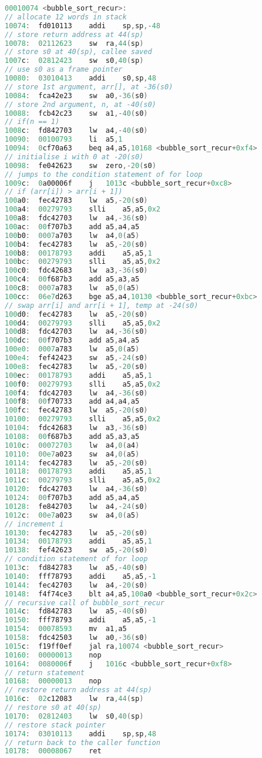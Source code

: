 \documentclass[
    a4paper,
    oneside,
    adjustmath,
    finemath,
    itemph,
    nonfrench,
    11pt
]{oblivoir}
\begin{document}
    \begin{lstlisting}[language=C, caption=Recursive bubble sort in RV32I]
00010074 <bubble_sort_recur>:
// allocate 12 words in stack
10074:	fd010113	addi	sp,sp,-48
// store return address at 44(sp)
10078:	02112623	sw	ra,44(sp)
// store s0 at 40(sp), callee saved
1007c:	02812423	sw	s0,40(sp)
// use s0 as a frame pointer
10080:	03010413	addi	s0,sp,48
// store 1st argument, arr[], at -36(s0)
10084:	fca42e23	sw	a0,-36(s0)
// store 2nd argument, n, at -40(s0)
10088:	fcb42c23	sw	a1,-40(s0)
// if(n == 1)
1008c:	fd842703	lw	a4,-40(s0)
10090:	00100793	li	a5,1
10094:	0cf70a63	beq	a4,a5,10168 <bubble_sort_recur+0xf4>
// initialise i with 0 at -20(s0)
10098:	fe042623	sw	zero,-20(s0)
// jumps to the condition statement of for loop
1009c:	0a00006f	j	1013c <bubble_sort_recur+0xc8>
// if (arr[i]) > arr[i + 1])
100a0:	fec42783	lw	a5,-20(s0)
100a4:	00279793	slli	a5,a5,0x2
100a8:	fdc42703	lw	a4,-36(s0)
100ac:	00f707b3	add	a5,a4,a5
100b0:	0007a703	lw	a4,0(a5)
100b4:	fec42783	lw	a5,-20(s0)
100b8:	00178793	addi	a5,a5,1
100bc:	00279793	slli	a5,a5,0x2
100c0:	fdc42683	lw	a3,-36(s0)
100c4:	00f687b3	add	a5,a3,a5
100c8:	0007a783	lw	a5,0(a5)
100cc:	06e7d263	bge	a5,a4,10130 <bubble_sort_recur+0xbc>
// swap arr[i] and arr[i + 1], temp at -24(s0)
100d0:	fec42783	lw	a5,-20(s0)
100d4:	00279793	slli	a5,a5,0x2
100d8:	fdc42703	lw	a4,-36(s0)
100dc:	00f707b3	add	a5,a4,a5
100e0:	0007a783	lw	a5,0(a5)
100e4:	fef42423	sw	a5,-24(s0)
100e8:	fec42783	lw	a5,-20(s0)
100ec:	00178793	addi	a5,a5,1
100f0:	00279793	slli	a5,a5,0x2
100f4:	fdc42703	lw	a4,-36(s0)
100f8:	00f70733	add	a4,a4,a5
100fc:	fec42783	lw	a5,-20(s0)
10100:	00279793	slli	a5,a5,0x2
10104:	fdc42683	lw	a3,-36(s0)
10108:	00f687b3	add	a5,a3,a5
1010c:	00072703	lw	a4,0(a4)
10110:	00e7a023	sw	a4,0(a5)
10114:	fec42783	lw	a5,-20(s0)
10118:	00178793	addi	a5,a5,1
1011c:	00279793	slli	a5,a5,0x2
10120:	fdc42703	lw	a4,-36(s0)
10124:	00f707b3	add	a5,a4,a5
10128:	fe842703	lw	a4,-24(s0)
1012c:	00e7a023	sw	a4,0(a5)
// increment i
10130:	fec42783	lw	a5,-20(s0)
10134:	00178793	addi	a5,a5,1
10138:	fef42623	sw	a5,-20(s0)
// condition statement of for loop
1013c:	fd842783	lw	a5,-40(s0)
10140:	fff78793	addi	a5,a5,-1
10144:	fec42703	lw	a4,-20(s0)
10148:	f4f74ce3	blt	a4,a5,100a0 <bubble_sort_recur+0x2c>
// recursive call of bubble_sort_recur
1014c:	fd842783	lw	a5,-40(s0)
10150:	fff78793	addi	a5,a5,-1
10154:	00078593	mv	a1,a5
10158:	fdc42503	lw	a0,-36(s0)
1015c:	f19ff0ef	jal	ra,10074 <bubble_sort_recur>
10160:	00000013	nop
10164:	0080006f	j	1016c <bubble_sort_recur+0xf8>
// return statement
10168:	00000013	nop
// restore return address at 44(sp)
1016c:	02c12083	lw	ra,44(sp)
// restore s0 at 40(sp)
10170:	02812403	lw	s0,40(sp)
// restore stack pointer
10174:	03010113	addi	sp,sp,48
// return back to the caller function
10178:	00008067	ret
    \end{lstlisting}
\end{document}
